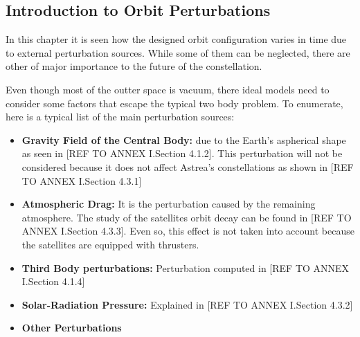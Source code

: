 \subsection{Introduction to Orbit Perturbations\cite{Vallado2007}}\label{TypesPerturb}

In this chapter it is seen how the designed orbit configuration varies in time due to external perturbation sources. While some of them can be neglected, there are other of major importance to the future of the constellation.

Even though most of the outter space is vacuum, there ideal models need to consider some factors that escape the typical two body problem. To enumerate, here is a typical list of the main perturbation sources:
\begin{itemize}
\item \textbf{Gravity Field of the Central Body:} due to the Earth's aspherical shape as seen in [REF TO ANNEX I.Section 4.1.2]. This perturbation will not be considered because it does not affect Astrea's constellations as shown in [REF TO ANNEX I.Section 4.3.1]
\item \textbf{Atmospheric Drag:} It is the perturbation caused by the remaining atmosphere. The study of the satellites orbit decay can be found in [REF TO ANNEX I.Section 4.3.3]. Even so, this effect is not taken into account because the satellites are equipped with thrusters.
\item \textbf{Third Body perturbations:} Perturbation computed in [REF TO ANNEX I.Section 4.1.4]
\item \textbf{Solar-Radiation Pressure:} Explained in [REF TO ANNEX I.Section 4.3.2]
\item \textbf{Other Perturbations}
\end{itemize}
